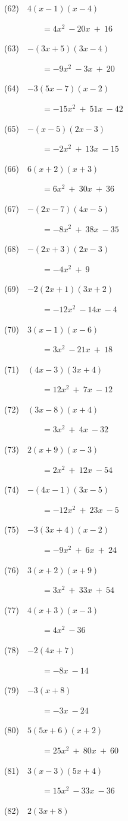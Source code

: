 \documentclass[a4j,twocolumn,10pt,fleqn]{jarticle}
\begin{document}
(62)~~$4(x-1)(x-4)$

~~~~~~~~~$=4x^2~-20x~+~16$

(63)~~$-(3x+5)(3x-4)$

~~~~~~~~~$=-9x^2~-3x~+~20$

(64)~~$-3(5x-7)(x-2)$

~~~~~~~~~$=-15x^2~+~51x~-42$

(65)~~$-(x-5)(2x-3)$

~~~~~~~~~$=-2x^2~+~13x~-15$

(66)~~$6(x+2)(x+3)$

~~~~~~~~~$=6x^2~+~30x~+~36$

(67)~~$-(2x-7)(4x-5)$

~~~~~~~~~$=-8x^2~+~38x~-35$

(68)~~$-(2x+3)(2x-3)$

~~~~~~~~~$=-4x^2~+~9$

(69)~~$-2(2x+1)(3x+2)$

~~~~~~~~~$=-12x^2~-14x~-4$

(70)~~$3(x-1)(x-6)$

~~~~~~~~~$=3x^2~-21x~+~18$

(71)~~$(4x-3)(3x+4)$

~~~~~~~~~$=12x^2~+~7x~-12$

(72)~~$(3x-8)(x+4)$

~~~~~~~~~$=3x^2~+~4x~-32$

(73)~~$2(x+9)(x-3)$

~~~~~~~~~$=2x^2~+~12x~-54$

(74)~~$-(4x-1)(3x-5)$

~~~~~~~~~$=-12x^2~+~23x~-5$

(75)~~$-3(3x+4)(x-2)$

~~~~~~~~~$=-9x^2~+~6x~+~24$

(76)~~$3(x+2)(x+9)$

~~~~~~~~~$=3x^2~+~33x~+~54$

(77)~~$4(x+3)(x-3)$

~~~~~~~~~$=4x^2~-36$

(78)~~$-2(4x+7)$

~~~~~~~~~$=-8x~-14$

(79)~~$-3(x+8)$

~~~~~~~~~$=-3x~-24$

(80)~~$5(5x+6)(x+2)$

~~~~~~~~~$=25x^2~+~80x~+~60$

(81)~~$3(x-3)(5x+4)$

~~~~~~~~~$=15x^2~-33x~-36$

(82)~~$2(3x+8)$
\end{document}

